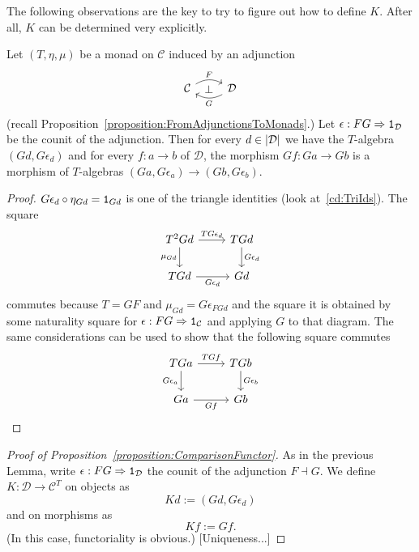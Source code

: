 The following observations are the key to try to figure out how to
define \(K\). After all, \(K\) can be determined very explicitly.

\begin{lemma}
  Let \((T, \eta, \mu)\) be a monad on \(\mathcal{C}\) induced by an adjunction
  \[
    \begin{tikzcd}
      \mathcal{C} \ar["{F}"{name=left}, r, bend left] & \mathcal{D} \ar["{G}"{name=right},
      l, bend left] \ar["{\perp}"description, phantom, from=left, to=right]
    \end{tikzcd}
  \]
  (recall Proposition~\ref{proposition:FromAdjunctionsToMonads}.) Let
  \(\epsilon : FG \Rightarrow \mathtt 1_{\mathcal{D}}\) be the counit of the adjunction. Then for every
  \(d \in \left\lvert\mathcal{D}\right\rvert\) we have the \(T\)-algebra \(\left( Gd, G\epsilon_d \right)\)
  and for every \(f : a \to b\) of \(\mathcal{D}\), the morphism \(Gf : Ga \to Gb\) is
  a morphism of \(T\)-algebras \(\left( Ga, G\epsilon_a \right) \to \left( Gb, G\epsilon_b \right)\).
\end{lemma}

\begin{proof}
  \(G\epsilon_d \circ \eta_{Gd} = \mathtt 1_{Gd}\) is one of the triangle identities
  (look at~\eqref{cd:TriIds}). The square
  \[
    \begin{tikzcd}
      T^2Gd \ar["{\mu_{Gd}}", d, swap] \ar["{TG\epsilon_d}", r] & TGd \ar["{G\epsilon_d}", d] \\
      TGd \ar["{G\epsilon_d}", r, swap] & Gd
    \end{tikzcd}
  \]
  commutes because \(T = GF\) and \(\mu_{Gd} = G\epsilon_{FGd}\) and the square it is obtained by some
  naturality square for \(\epsilon : FG \Rightarrow \mathtt 1_{\mathcal{C}}\) and applying \(G\) to that
  diagram. The same considerations can be used to show that the
  following square commutes
  \[
    \begin{tikzcd}
      TGa \ar["{G\epsilon_a}", d, swap] \ar["{TGf}", r] & TGb \ar["{G\epsilon_b}", d] \\
      Ga \ar["{Gf}", r, swap] & Gb
    \end{tikzcd}
    \qedhere
  \]
\end{proof}

\begin{proof}[Proof of Proposition~\ref{proposition:ComparisonFunctor}]
  As in the previous Lemma, write
  \(\epsilon : FG \Rightarrow \mathtt 1_{\mathcal{D}}\) the counit of the adjunction
  \(F \dashv G\). We define \(K : \mathcal{D} \to \mathcal{C}^T\) on objects as
  \[
    Kd := (Gd, G\epsilon_d)
  \]
  and on morphisms as
  \[
    Kf := Gf .
  \]
  (In this case, functoriality is obvious.) {\color{red}
    [Uniqueness...]}
\end{proof}



